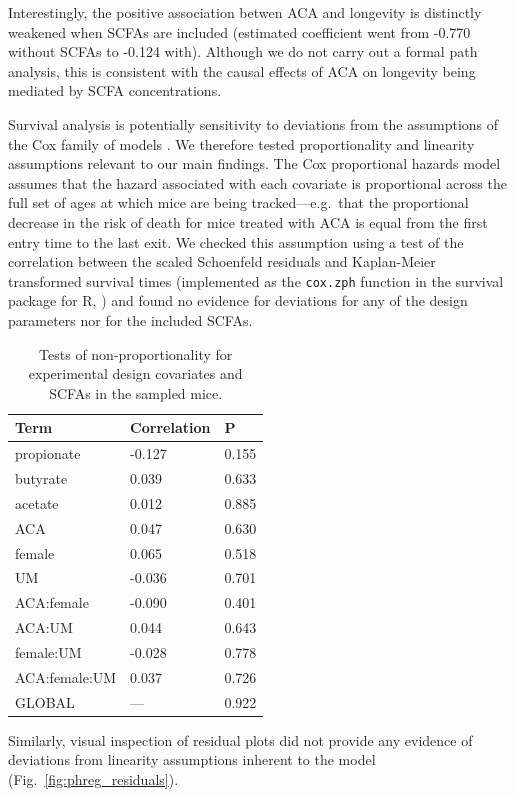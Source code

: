 \documentclass{doc/template/bmcart-nofigbox}
\begin{document}
Interestingly, the positive association betwen ACA and longevity is distinctly
weakened when SCFAs are included (estimated coefficient went from -0.770
without SCFAs to -0.124 with).
Although we do not carry out a formal path analysis, this is consistent with
the causal effects of ACA on longevity being mediated by SCFA concentrations.

Survival analysis is potentially sensitivity to deviations
from the assumptions of the Cox family of models \cite{Grambsch1994}.
We therefore tested proportionality and linearity assumptions relevant to our
main findings.
The Cox proportional hazards model assumes that the hazard associated with each
covariate is proportional across the full set of ages at which mice are being
tracked---e.g.~that the proportional decrease in the
risk of death for mice treated with ACA is equal from the first entry time to
the last exit.
We checked this assumption using a test of the correlation between the scaled
Schoenfeld residuals and Kaplan-Meier transformed survival times (implemented
as the \texttt{cox.zph} function in the survival package for R,
\cite{Therneau2015}) and found no evidence for deviations for any of the design
parameters nor for the included SCFAs.

\begin{table}[h]
  \caption{\label{tbl:phreg_diagnostic}Tests of non-proportionality for experimental design covariates and SCFAs in the sampled mice.}
  \begin{tabular}{lll}
    \hline
    Term & Correlation & P \\
    \hline
    propionate & -0.127 & 0.155 \\
    butyrate & 0.039 & 0.633 \\
    acetate & 0.012 & 0.885 \\
    ACA & 0.047 & 0.630 \\
    female & 0.065 & 0.518 \\
    UM & -0.036 & 0.701 \\
    ACA:female & -0.090 & 0.401 \\
    ACA:UM & 0.044 & 0.643 \\
    female:UM & -0.028 & 0.778 \\
    ACA:female:UM & 0.037 & 0.726 \\
    GLOBAL & --- & 0.922 \\
    \hline
  \end{tabular}
\end{table}

Similarly, visual inspection of residual plots did not provide any evidence of
deviations from linearity assumptions inherent to the model
(Fig.~\ref{fig:phreg_residuals}).
\end{document}
